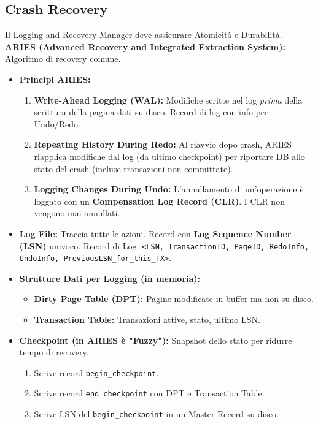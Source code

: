 \subsection{Crash Recovery}
Il Logging and Recovery Manager deve assicurare Atomicità e Durabilità.
\textbf{ARIES (Advanced Recovery and Integrated Extraction System):} Algoritmo di recovery comune.
\begin{itemize}
    \item \textbf{Principi ARIES:}
    \begin{enumerate}
        \item \textbf{Write-Ahead Logging (WAL):} Modifiche scritte nel log \textit{prima} della scrittura della pagina dati su disco. Record di log con info per Undo/Redo.
        \item \textbf{Repeating History During Redo:} Al riavvio dopo crash, ARIES riapplica modifiche dal log (da ultimo checkpoint) per riportare DB allo stato del crash (incluse transazioni non committate).
        \item \textbf{Logging Changes During Undo:} L'annullamento di un'operazione è loggato con un \textbf{Compensation Log Record (CLR)}. I CLR non vengono mai annullati.
    \end{enumerate}
    \item \textbf{Log File:} Traccia tutte le azioni. Record con \textbf{Log Sequence Number (LSN)} univoco.
    Record di Log: \texttt{<LSN, TransactionID, PageID, RedoInfo, UndoInfo, PreviousLSN\_for\_this\_TX>}.
    \item \textbf{Strutture Dati per Logging (in memoria):}
    \begin{itemize}
        \item \textbf{Dirty Page Table (DPT):} Pagine modificate in buffer ma non su disco.
        \item \textbf{Transaction Table:} Transazioni attive, stato, ultimo LSN.
    \end{itemize}
    \item \textbf{Checkpoint (in ARIES è "Fuzzy"):} Snapshot dello stato per ridurre tempo di recovery.
    \begin{enumerate}
        \item Scrive record \texttt{begin\_checkpoint}.
        \item Scrive record \texttt{end\_checkpoint} con DPT e Transaction Table.
        \item Scrive LSN del \texttt{begin\_checkpoint} in un Master Record su disco.
    \end{enumerate}

\end{itemize}

